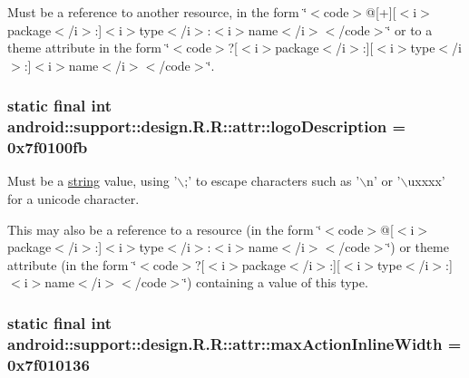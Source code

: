 Must be a reference to another resource, in the form \char`\"{}$<$code$>$@\mbox{[}+\mbox{]}\mbox{[}$<$i$>$package$<$/i$>$:\mbox{]}$<$i$>$type$<$/i$>$:$<$i$>$name$<$/i$>$$<$/code$>$\char`\"{} or to a theme attribute in the form \char`\"{}$<$code$>$?\mbox{[}$<$i$>$package$<$/i$>$:\mbox{]}\mbox{[}$<$i$>$type$<$/i$>$:\mbox{]}$<$i$>$name$<$/i$>$$<$/code$>$\char`\"{}. \hypertarget{classandroid_1_1support_1_1design_1_1_r_1_1attr_de156d1912d1add88a0f3da9fd4f0ef6}{
\subsubsection[{logoDescription}]{\setlength{\rightskip}{0pt plus 5cm}static final int android::support::design.R.R::attr::logoDescription = 0x7f0100fb}}
\label{classandroid_1_1support_1_1design_1_1_r_1_1attr_de156d1912d1add88a0f3da9fd4f0ef6}


Must be a \hyperlink{classandroid_1_1support_1_1design_1_1_r_1_1string}{string} value, using '$\backslash$;' to escape characters such as '$\backslash$n' or '$\backslash$uxxxx' for a unicode character. 

This may also be a reference to a resource (in the form \char`\"{}$<$code$>$@\mbox{[}$<$i$>$package$<$/i$>$:\mbox{]}$<$i$>$type$<$/i$>$:$<$i$>$name$<$/i$>$$<$/code$>$\char`\"{}) or theme attribute (in the form \char`\"{}$<$code$>$?\mbox{[}$<$i$>$package$<$/i$>$:\mbox{]}\mbox{[}$<$i$>$type$<$/i$>$:\mbox{]}$<$i$>$name$<$/i$>$$<$/code$>$\char`\"{}) containing a value of this type. \hypertarget{classandroid_1_1support_1_1design_1_1_r_1_1attr_c1ab8fc571fcae77a58b8d46290c1170}{
\subsubsection[{maxActionInlineWidth}]{\setlength{\rightskip}{0pt plus 5cm}static final int android::support::design.R.R::attr::maxActionInlineWidth = 0x7f010136}}
\label{classandroid_1_1support_1_1design_1_1_r_1_1attr_c1ab8fc571fcae77a58b8d46290c1170}


